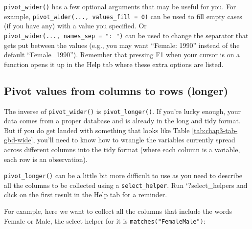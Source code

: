 \documentclass[
  12pt,
  krantz2]{krantz}
\makeatletter
\newenvironment{Shaded}{\begin{snugshade}}{\end{snugshade}}
\newcommand{\DataTypeTok}[1]{\textcolor[rgb]{0.13,0.29,0.53}{#1}}
\newcommand{\DecValTok}[1]{\textcolor[rgb]{0.00,0.00,0.81}{#1}}
\newcommand{\KeywordTok}[1]{\textcolor[rgb]{0.13,0.29,0.53}{\textbf{#1}}}
\newcommand{\NormalTok}[1]{#1}
\newcommand{\OperatorTok}[1]{\textcolor[rgb]{0.81,0.36,0.00}{\textbf{#1}}}
\newcommand{\StringTok}[1]{\textcolor[rgb]{0.31,0.60,0.02}{#1}}
\newenvironment{kframe}{%
\medskip{}
\setlength{\fboxsep}{.8em}
 \def\at@end@of@kframe{}%
 \ifinner\ifhmode%
  \def\at@end@of@kframe{\end{minipage}}%
  \begin{minipage}{\columnwidth}%
 \fi\fi%
 \def\FrameCommand##1{\hskip\@totalleftmargin \hskip-\fboxsep
 \colorbox{shadecolor}{##1}\hskip-\fboxsep
     \hskip-\linewidth \hskip-\@totalleftmargin \hskip\columnwidth}%
 \MakeFramed {\advance\hsize-\width
   \@totalleftmargin\z@ \linewidth\hsize
   \@setminipage}}%
 {\par\unskip\endMakeFramed%
 \at@end@of@kframe}
\renewenvironment{Shaded}{\begin{kframe}}{\end{kframe}}
\makeatother
\begin{document}
\texttt{pivot\_wider()} has a few optional arguments that may be useful for you.
For example, \texttt{pivot\_wider(...,\ values\_fill\ =\ 0)} can be used to fill empty cases (if you have any) with a value you specified.
Or \texttt{pivot\_wider(...,\ names\_sep\ =\ ":\ ")} can be used to change the separator that gets put between the values (e.g., you may want ``Female: 1990'' instead of the default ``Female\_1990'').
Remember that pressing F1 when your cursor is on a function opens it up in the Help tab where these extra options are listed.

\hypertarget{pivot-values-from-columns-to-rows-longer}{%
\subsection{Pivot values from columns to rows (longer)}\label{pivot-values-from-columns-to-rows-longer}}


The inverse of \texttt{pivot\_wider()} is \texttt{pivot\_longer()}.
If you're lucky enough, your data comes from a proper database and is already in the long and tidy format.
But if you do get landed with something that looks like Table \ref{tab:chap3-tab-gbd-wide}, you'll need to know how to wrangle the variables currently spread across different columns into the tidy format (where each column is a variable, each row is an observation).

\texttt{pivot\_longer()} can be a little bit more difficult to use as you need to describe all the columns to be collected using a \texttt{select\_helper}. Run `?select\_helpers and click on the first result in the Help tab for a reminder.

For example, here we want to collect all the columns that include the words Female or Male, the select helper for it is \texttt{matches("Female\textbar{}Male")}:

\begin{Shaded}
\end{Shaded}
\end{document}
